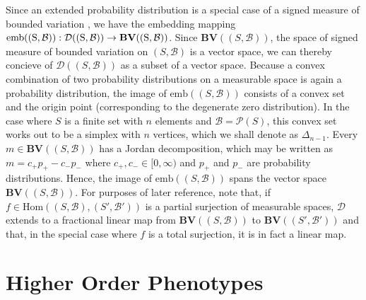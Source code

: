 Since an extended probability distribution is a special case of a signed measure of bounded variation \cite{Taylor1965}, we have the embedding mapping $\rm{emb}((S,\mathcal{B})) : \mathcal{D}((S,\mathcal{B})) \to \mathbf{BV}((S,\mathcal{B}))$.  Since $\mathbf{BV}((S,\mathcal{B}))$, the space of signed measure of bounded variation on $(S,\mathcal{B})$ is a vector space, we can thereby concieve of $\mathcal{D}((S,\mathcal{B}))$ as a subset of a vector space.  Because a convex combination of two probability distributions on a measurable space is again a probability distribution, the image of $\mathrm{emb}((S,\mathcal{B}))$ consists of a convex set and the origin point (corresponding to the degenerate zero distribution).  In the case where $S$ is a finite set with $n$ elements and $\mathcal{B} = \mathcal{P}(S)$, this convex set works out to be a simplex with $n$ vertices, which we shall denote as $\Delta_{n-1}$.  Every $m \in \mathbf{BV}((S,\mathcal{B}))$ has a Jordan decomposition, which may be written as $m = c_{+} p_{+} - c_{-} p_{-}$ where $c_{+}, c_{-} \in [0,\infty)$ and $p_{+}$ and $p_{-}$ are probability distributions.  Hence, the image of $\mathrm{emb}((S,\mathcal{B}))$ spans the vector space $\mathbf{BV}((S,\mathcal{B}))$.  For purposes of later reference, note that, if $f \in \mathrm{Hom}((S,\mathcal{B}), (S',\mathcal{B}'))$ is a partial surjection of measurable spaces, $\mathcal{D}$ extends to a fractional linear map from $\mathbf{BV}((S,\mathcal{B}))$ to $\mathbf{BV}((S',\mathcal{B}'))$ and that, in the special case where $f$ is a total surjection, it is in fact a linear map.

\section{Higher Order Phenotypes}

